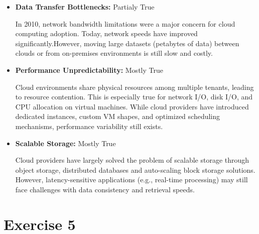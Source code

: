 \documentclass{article}
\newcommand{\exercise}[1]{
    \section*{Exercise #1}
    \markboth{Exercise #1}{}
}
\begin{document}
\begin{itemize}
  \item \textbf{Data Transfer Bottlenecks:}\newline
  Partialy True\newline

  In 2010, network bandwidth limitations were a major
  concern for cloud computing adoption. Today, network
  speeds have improved significantly.However, moving
  large datasets (petabytes of data) between clouds
  or from on-premises environments is still slow and costly.

  \item \textbf{Performance Unpredictability:}\newline
  Mostly True\newline

  Cloud environments share physical resources among
  multiple tenants, leading to resource contention.
  This is especially true for network I/O, disk I/O,
  and CPU allocation on virtual machines. While cloud
  providers have introduced dedicated instances, custom
  VM shapes, and optimized scheduling mechanisms,
  performance variability still exists.

  \item \textbf{Scalable Storage:}\newline
  Mostly True\newline

  Cloud providers have largely solved the problem
  of scalable storage through object storage,
  distributed databases and auto-scaling block storage
  solutions. However, latency-sensitive applications
  (e.g., real-time processing) may still face challenges
  with data consistency and retrieval speeds.
\end{itemize}

\newpage




\exercise{5}
\end{document}
